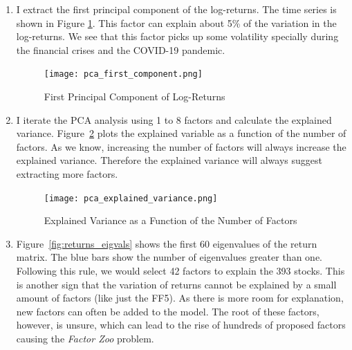 \begin{solution}
    \begin{enumerate}[label = \Alph*)]
        \item I extract the first principal component of the log-returns. The time series is shown in Figure \ref{fig:pca_time_series}. This factor can explain about 5\% of the variation in the log-returns. We see that this factor picks up some volatility specially during the financial crises and the COVID-19 pandemic.
        
        \begin{figure}[!htbp]
            \begin{small}
                \begin{center}
                    \texttt{[image: pca\_first\_component.png]}
                \end{center}
                \caption{First Principal Component of Log-Returns}
                \label{fig:pca_time_series}
            \end{small}
        \end{figure}
        
        \item I iterate the PCA analysis using 1 to 8 factors and calculate the explained variance. Figure~\ref{fig:pca_crit} plots the explained variable as a function of the number of factors. As we know, increasing the number of factors will always increase the explained variance. Therefore the explained variance will always suggest extracting more factors.

        \begin{figure}[!htbp]
            \begin{small}
                \begin{center}
                    \texttt{[image: pca\_explained\_variance.png]}
                \end{center}
                \caption{Explained Variance as a Function of the Number of Factors}
                \label{fig:pca_crit}
            \end{small}
        \end{figure}
        
        \item Figure~\ref{fig:returns_eigvals} shows the first 60 eigenvalues of the return matrix. The blue bars show the number of eigenvalues greater than one. Following this rule, we would select 42 factors to explain the 393 stocks. This is another sign that the variation of returns cannot be explained by a small amount of factors (like just the FF5). As there is more room for explanation, new factors can often be added to the model. The root of these factors, however, is unsure, which can lead to the rise of hundreds of proposed factors causing the \textit{Factor Zoo} problem.
        

\end{enumerate}
\end{solution}
